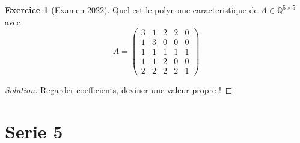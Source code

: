 \documentclass[a4paper,12pt,french]{report}
\theoremstyle{plain}
\theoremstyle{definition}
\newtheorem{exercise}{Exercice}[chapter]
\begin{document}
\begin{exercise}[Examen 2022]
Quel est le polynome caracteristique de $A\in \mathbb{Q}^{5\times5}$ avec 
$$
A=\begin{pmatrix}
3 & 1 & 2 & 2 & 0 \\
1 & 3 & 0 & 0 & 0 \\
1 & 1 & 1 & 1 & 1 \\
1 & 1 & 2 & 0 & 0 \\
2 & 2 & 2 & 2 & 1
\end{pmatrix}
$$
\end{exercise}
\begin{proof}[Solution]
Regarder coefficients, deviner une valeur propre !
\end{proof}
\chapter{Serie 5}
\end{document}
